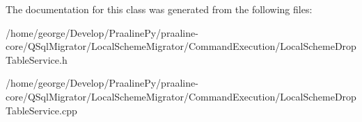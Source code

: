 The documentation for this class was generated from the following files\+:\begin{DoxyCompactItemize}
\item 
/home/george/\+Develop/\+Praaline\+Py/praaline-\/core/\+Q\+Sql\+Migrator/\+Local\+Scheme\+Migrator/\+Command\+Execution/Local\+Scheme\+Drop\+Table\+Service.\+h\item 
/home/george/\+Develop/\+Praaline\+Py/praaline-\/core/\+Q\+Sql\+Migrator/\+Local\+Scheme\+Migrator/\+Command\+Execution/Local\+Scheme\+Drop\+Table\+Service.\+cpp\end{DoxyCompactItemize}
